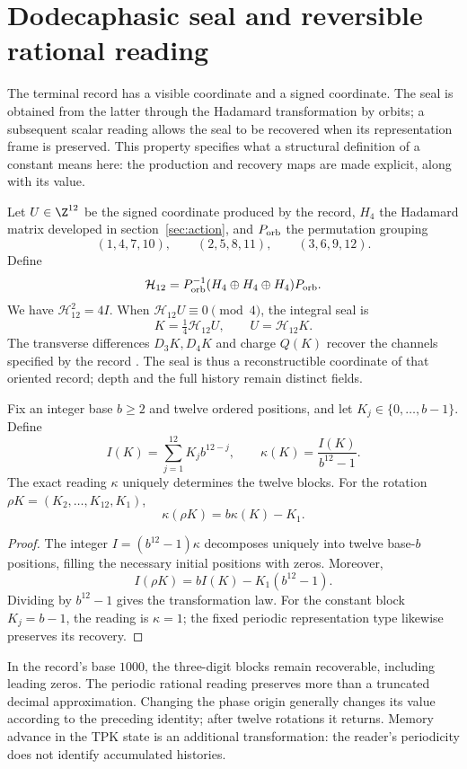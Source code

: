 \section{Dodecaphasic seal and reversible rational reading}
\label{sec:sello}

The terminal record has a visible coordinate and a signed
coordinate. The seal is obtained from the latter through the Hadamard
transformation by orbits; a subsequent scalar reading allows the
seal to be recovered when its representation frame is preserved. This property
specifies what a structural definition of a constant means here:
the production and recovery maps are made explicit, along with its value.

Let $U\in\Z^{12}$ be the signed coordinate produced by the record,
$H_4$ the Hadamard matrix developed in section~\ref{sec:action},
and $P_{\rm orb}$ the permutation grouping
\[
 (1,4,7,10),\qquad(2,5,8,11),\qquad(3,6,9,12).
\]
Define
\[
 \mathcal H_{12}=P_{\rm orb}^{-1}
 (H_4\oplus H_4\oplus H_4)P_{\rm orb}.
\]
We have $\mathcal H_{12}^2=4I$. When
$\mathcal H_{12}U\equiv0\pmod4$, the integral seal is
\[
 K=\tfrac14\mathcal H_{12}U,
 \qquad U=\mathcal H_{12}K.
\]
The transverse differences $D_3K,D_4K$ and charge $Q(K)$ recover
the channels specified by the record \cite{registro}.
The seal is thus a reconstructible coordinate of that oriented record;
depth and the full history remain distinct fields.

\begin{proposition}
Fix an integer base $b\ge2$ and twelve ordered positions, and let
$K_j\in\{0,\ldots,b-1\}$. Define
\[
 I(K)=\sum_{j=1}^{12}K_jb^{12-j},\qquad
 \kappa(K)=\frac{I(K)}{b^{12}-1}.
\]
The exact reading $\kappa$ uniquely determines the twelve blocks.
For the rotation $\rho K=(K_2,\ldots,K_{12},K_1)$,
\[
 \boxed{\kappa(\rho K)=b\kappa(K)-K_1.}
\]
\end{proposition}
\begin{proof}
The integer $I=(b^{12}-1)\kappa$ decomposes uniquely into twelve
base-$b$ positions, filling the necessary initial positions
with zeros. Moreover,
\[
 I(\rho K)=bI(K)-K_1(b^{12}-1).
\]
Dividing by $b^{12}-1$ gives the transformation law. For the constant
block $K_j=b-1$, the reading is $\kappa=1$; the fixed periodic
representation type likewise preserves its recovery.
\end{proof}

In the record's base $1000$, the three-digit blocks remain
recoverable, including leading zeros. The periodic rational
reading preserves more than a truncated decimal approximation.
Changing the phase origin generally changes its value according to
the preceding identity; after twelve rotations it returns.
Memory advance in the TPK state is an additional transformation:
the reader's periodicity does not identify accumulated histories.

